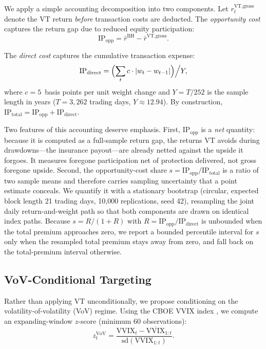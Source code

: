 \documentclass[12pt,a4paper]{article}
\begin{document}
We apply a simple accounting decomposition into two components. Let $r_t^{\text{VT,gross}}$ denote the VT return \emph{before} transaction costs are deducted. The \emph{opportunity cost} captures the return gap due to reduced equity participation:
\begin{equation}
\text{IP}_{\text{opp}} = \bar{r}^{\text{BH}} - \bar{r}^{\text{VT,gross}}.
\label{eq:ip_opp}
\end{equation}

The \emph{direct cost} captures the cumulative transaction expense:
\begin{equation}
\text{IP}_{\text{direct}} = \Bigl( \sum_{t} c \cdot |w_t - w_{t-1}| \Bigr) \Big/ Y,
\label{eq:ip_direct}
\end{equation}
where $c = 5$~basis points per unit weight change and $Y = T/252$ is the sample length in years ($T = 3{,}262$ trading days, $Y \approx 12.94$). By construction, $\text{IP}_{\text{total}} = \text{IP}_{\text{opp}} + \text{IP}_{\text{direct}}$.

Two features of this accounting deserve emphasis. First, $\text{IP}_{\text{opp}}$ is a \emph{net} quantity: because it is computed as a full-sample return gap, the returns VT avoids during drawdowns---the insurance payout---are already netted against the upside it forgoes. It measures foregone participation net of protection delivered, not gross foregone upside. Second, the opportunity-cost share $s = \text{IP}_{\text{opp}} / \text{IP}_{\text{total}}$ is a ratio of two sample means and therefore carries sampling uncertainty that a point estimate conceals. We quantify it with a stationary bootstrap \citep{politis1994} (circular, expected block length 21 trading days, 10{,}000 replications, seed 42), resampling the joint daily return-and-weight path so that both components are drawn on identical index paths. Because $s = R/(1+R)$ with $R = \text{IP}_{\text{opp}} / \text{IP}_{\text{direct}}$ is unbounded when the total premium approaches zero, we report a bounded percentile interval for $s$ only when the resampled total premium stays away from zero, and fall back on the total-premium interval otherwise.

\subsection{VoV-Conditional Targeting}

Rather than applying VT unconditionally, we propose conditioning on the volatility-of-volatility (VoV) regime. Using the CBOE VVIX index \citep{cboe2012}, we compute an expanding-window $z$-score (minimum 60 observations):
\begin{equation}
z_t^{\text{VoV}} = \frac{\text{VVIX}_t - \overline{\text{VVIX}}_{1:t}}{\text{sd}(\text{VVIX}_{1:t})}.
\end{equation}
\end{document}

